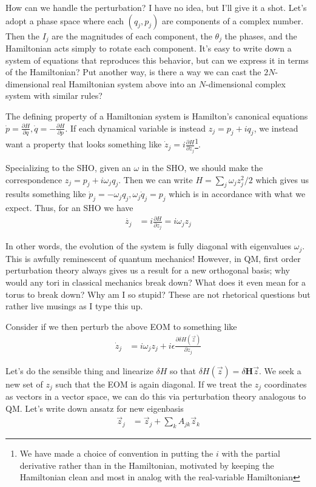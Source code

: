 \documentclass[12pt]{report}
\newcommand*{\pd}[2]{\frac{\partial#1}{\partial#2}}
\begin{document}
How can we handle the perturbation? I have no idea, but I'll give it a shot.
Let's adopt a phase space where each $(q_j, p_j)$ are components of a complex
number. Then the $I_j$ are the magnitudes of each component, the $\theta_j$ the
phases, and the Hamiltonian acts simply to rotate each component. It's easy to
write down a system of equations that reproduces this behavior, but can we
express it in terms of the Hamiltonian? Put another way, is there a way we can
cast the $2N$-dimensional real Hamiltonian system above into an $N$-dimensional
complex system with similar rules?

The defining property of a Hamiltonian system is Hamilton's canonical equations
$\dot{p} = \pd{H}{q}, \dot{q} = -\pd{H}{p}$. If each dynamical variable is
instead $z_j = p_j + iq_j$, we instead want a property that looks something like
$\dot{z}_j = i\pd{H}{z_j}$\footnote{We have made a choice of convention in
putting the $i$ with the partial derivative rather than in the Hamiltonian,
motivated by keeping the Hamiltonian clean and most in analog with the
real-variable Hamiltonian}.

Specializing to the SHO, given an $\omega$ in the SHO, we should make the
correspondence $z_j = p_j + i\omega_jq_j$. Then we can write $H = \sum_j
\omega_j z_j^2/2$ which gives us results something like
$\dot{p}_j = -\omega_jq_j, \omega_j\dot{q}_j = p_j$ which is in accordance with
what we expect. Thus, for an SHO we have
\begin{align}
    \dot{z_j} &= i\pd{H}{z_j} = i\omega_jz_j
\end{align}

In other words, the evolution of the system is fully diagonal with eigenvalues
$\omega_j$. This is awfully reminescent of quantum mechanics! However, in QM,
first order perturbation theory always gives us a result for a new orthogonal
basis; why would any tori in classical mechanics break down? What does it even
mean for a torus to break down? Why am I so stupid? These are not rhetorical
questions but rather live musings as I type this up.

Consider if we then perturb the above EOM to something like
\begin{align}
    \dot{z}_j &= i\omega_jz_j + i\epsilon \pd{\delta
    H\left(\vec{z}\right)}{z_j}
\end{align}

Let's do the sensible thing and linearize $\delta H$ so that
$\delta H(\vec{z}) = \delta \mathbf{H}\vec{z}$. We seek a new set of $z_j$
such that the EOM is again diagonal. If we treat the $z_j$ coordinates as
vectors in a vector space, we can do this via perturbation theory
analogous to QM\@. Let's write down ansatz for new eigenbasis
\begin{align}
    \vec{z}_j &= \vec{z}_j + \sum_kA_{jk}\vec{z}_k
\end{align}
\end{document}
